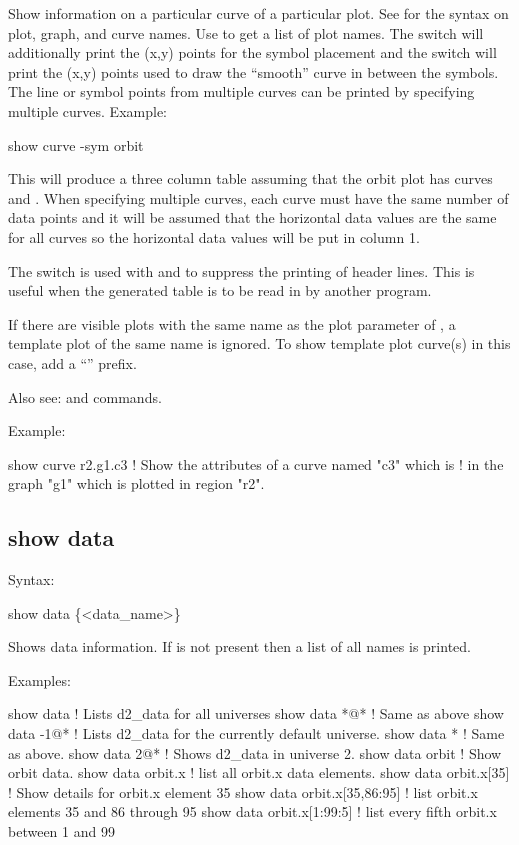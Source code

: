 {{{{{{{{{Show information on a particular curve of a particular plot. See  for the syntax on
plot, graph, and curve names.  Use  to get a list of plot names. The 
switch will additionally print the (x,y) points for the symbol placement and the  switch
will print the (x,y) points used to draw the ``smooth'' curve in between the symbols. The line or
symbol points from multiple curves can be printed by specifying multiple curves. Example:
\begin{example}
  show curve -sym orbit
\end{example}
This will produce a three column table assuming that the orbit plot has curves  and
. When specifying multiple curves, each curve must have the same number of data
points and it will be assumed that the horizontal data values are the same for all curves so the
horizontal data values will be put in column 1.

The  switch is used with  and  to suppress the printing of
header lines. This is useful when the generated table is to be read in by another program.

If there are visible plots with the same name as the plot parameter of , a template plot
of the same name is ignored. To show template plot curve(s) in this case, add a ``'' prefix.

Also see:  and  commands.

Example:
\begin{example}
  show curve r2.g1.c3     ! Show the attributes of a curve named "c3" which is 
                          !   in the graph "g1" which is plotted in region "r2".
\end{example}


\subsection{show data}
\label{s:show.data}

Syntax:
\begin{example}
  show data \{<data_name>\}
\end{example}

Shows data information. If  is not present then a list of all  names is
printed.

Examples:
\begin{example}
  show data                   ! Lists d2_data for all universes
  show data *@*               ! Same as above
  show data -1@*              ! Lists d2_data for the currently default universe.
  show data *                 ! Same as above.
  show data 2@*               ! Shows d2_data in universe 2.
  show data orbit             ! Show orbit data.
  show data orbit.x           ! list all orbit.x data elements.
  show data orbit.x[35]       ! Show details for orbit.x element 35
  show data orbit.x[35,86:95] ! list orbit.x elements 35 and 86 through 95
  show data orbit.x[1:99:5]   ! list every fifth orbit.x between 1 and 99  
\end{example}

}}}}}}}}}
